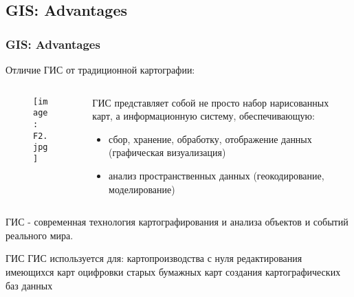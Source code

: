 \documentclass[pdflatex,compress,8pt,
	xcolor={dvipsnames,dvipsnames,svgnames,x11names,table},
	hyperref={	 
	pdfauthor={Lemenkova Polina}, 
	pdfsubject={Preentation}, 
	pdfcreator={Lemenkova Polina}, 
	pdfproducer={Lemenkova Polina}, 
	colorlinks=true,
	linkcolor=Red3, 
	citecolor=NavyBlue, 
	urlcolor = NavyBlue, 
	breaklinks = true}]{beamer}
\begin{document}
\subsection{GIS: Advantages}
\begin{frame}\frametitle{GIS: Advantages}
Отличие ГИС от традиционной картографии:

\begin{minipage}[0.4\textheight]{\textwidth}
		\begin{columns}[T]
			\begin{column}{0.5\textwidth}
				\begin{figure}[H]
					\centering
					\texttt{[image: F2.jpg]}
				\end{figure}
			\end{column}
			\begin{column}{0.5\textwidth}
\begin{alertblock}{}
ГИС  представляет собой не просто  набор нарисованных карт, а  информационную систему, 
обеспечивающую:
\begin{itemize}
	\item сбор, хранение, обработку, отображение данных (графическая визуализация)
	\item анализ пространственных данных (геокодирование, моделирование)
\end{itemize}
\end{alertblock}
			\end{column}
		\end{columns}
	\end{minipage}

\begin{block}{}
ГИС - современная технология картографирования и анализа  объектов и событий реального мира.
\end{block}

\begin{alertblock}{ГИС}
ГИС используется для: картопроизводства с нуля редактирования имеющихся карт оцифровки старых бумажных карт создания картографических баз данных
\end{alertblock}

\end{frame}
\end{document}
